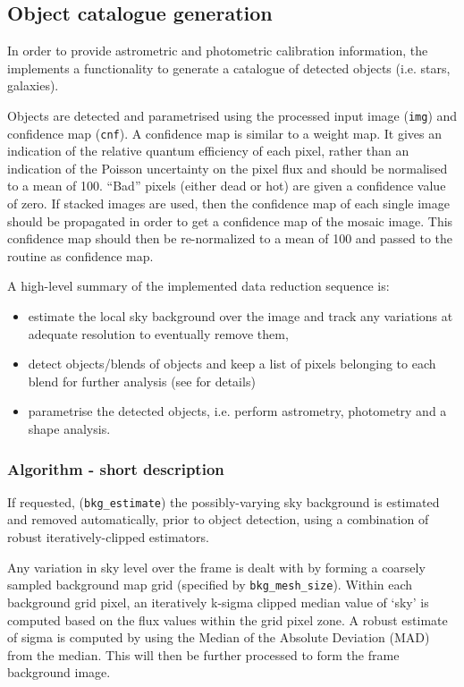 \subsection{Object catalogue generation}
\label{catalogue:main}

In order to provide astrometric and photometric calibration
information, the \HDRL implements a functionality to generate a
catalogue of detected objects (i.e. stars, galaxies).

Objects are detected and parametrised using the processed input image
(\verb+img+) and confidence map (\verb+cnf+). A confidence map is
similar to a weight map. It gives an indication of the relative
quantum efficiency of each pixel, rather than an indication of the
Poisson uncertainty on the pixel flux and should be normalised to a
mean of 100. ``Bad'' pixels (either dead or hot) are given a confidence
value of zero. If stacked images are used, then the confidence map of
each single image should be propagated in order to get a confidence
map of the mosaic image. This confidence map should then be
re-normalized to a mean of 100 and passed to the routine as confidence
map.

A high-level summary of the implemented data reduction sequence is:
\begin{itemize}
\item estimate the local sky background over the image and track any
    variations at adequate resolution to eventually remove them,
\item detect objects/blends of objects and keep a list of pixels
    belonging to each blend for further analysis (see \cite{Irwin85}
    for details)
  \item parametrise the detected objects, i.e. perform astrometry,
    photometry and a shape analysis.
\end{itemize}

\subsubsection{Algorithm - short description}


If requested, (\verb+bkg_estimate+) the possibly-varying sky
background is estimated and removed automatically, prior to object
detection, using a combination of robust iteratively-clipped
estimators.

Any variation in sky level over the frame is dealt with by forming a
coarsely sampled background map grid (specified by
\verb+bkg_mesh_size+).  Within each background grid pixel, an
iteratively k-sigma clipped median value of `sky' is computed based on
the flux values within the grid pixel zone. A robust estimate of sigma
is computed by using the Median of the Absolute Deviation (MAD) from
the median. This will then be further processed to form the frame
background image.

